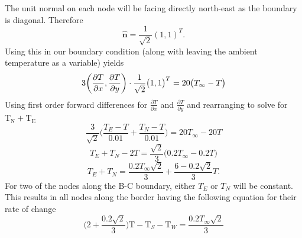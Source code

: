 \documentclass[12pt,a4paper]{article}
\begin{document}
\begin{center}
\end{center}
The unit normal on each node will be facing directly north-east as the boundary is diagonal. Therefore
\[\hat{\textbf{n}} = \frac{1}{\sqrt{2}}(1,1)^T.\]
Using this in our boundary condition (along with leaving the ambient temperature as a variable) yields
\[3\bigg{(}\frac{\partial T}{\partial x},\frac{\partial T}{\partial y}\bigg{)}\cdot\frac{1}{\sqrt{2}}\big{(}1,1\big{)}^T=20\big{(}T_\infty-T\big{)}\]
Using first order forward differences for $\frac{\partial T}{\partial x}$ and $\frac{\partial T}{\partial y}$ and rearranging to solve for $\text{T}_\text{N}+\text{T}_\text{E}$
\[\frac{3}{\sqrt{2}}\bigg(\frac{T_E-T}{0.01}+\frac{T_N-T}{0.01}\bigg)=20T_\infty-20T\]
\[T_E+T_N-2T=\frac{\sqrt{2}}{3}\big(0.2T_\infty-0.2T\big)\]
\[T_E+T_N=\frac{0.2T_\infty\sqrt{2}}{3}+\frac{6-0.2\sqrt{2}}{3}T.\]
For two of the nodes along the B-C boundary, either $T_E$ or $T_N$ will be constant. This results in all nodes along the border having the following equation for their rate of change
\[\bigg(2+\frac{0.2\sqrt{2}}{3}\bigg)\text{T}-\text{T}_{S}-\text{T}_{W} =\frac{0.2T_\infty\sqrt{2}}{3}\]
 
\end{document}

